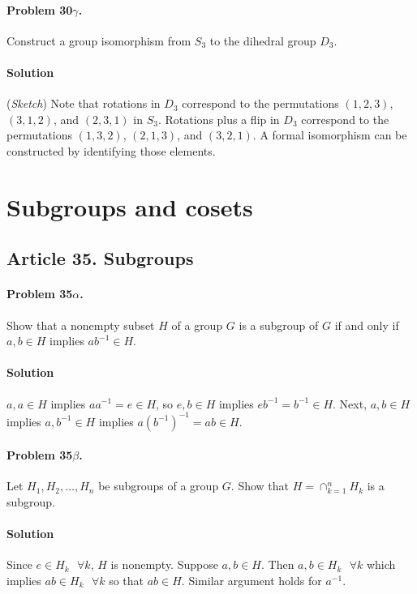 \paragraph{Problem 30$\gamma$.}
Construct a group isomorphism from $S_3$ to the dihedral group $D_3$.

\paragraph*{Solution}
(\textit{Sketch}) Note that rotations in $D_3$ correspond to the permutations
$(1,2,3)$, $(3,1,2)$, and $(2,3,1)$ in $S_3$. Rotations plus a flip in $D_3$
correspond to the permutations $(1,3,2)$, $(2,1,3)$, and $(3,2,1)$. A formal
isomorphism can be constructed by identifying those elements.


\section{Subgroups and cosets}


\subsection{Article 35. Subgroups}

\paragraph{Problem 35$\alpha$.}
Show that a nonempty subset $H$ of a group $G$ is a subgroup of $G$ if and only
if $a, b \in H$ implies $ab^{-1} \in H$.

\paragraph*{Solution}
$a,a \in H$ implies $aa^{-1} = e \in H$, so $e,b \in H$ implies $eb^{-1} = b^{-1}
\in H$. Next, $a, b \in H$ implies $a, b^{-1} \in H$ implies $a(b^{-1})^{-1} =
ab \in H$.

\paragraph{Problem 35$\beta$.}
Let $H_1, H_2, \dots, H_n$ be subgroups of a group $G$. Show that
$H = \cap_{k=1}^n H_k$ is a subgroup.

\paragraph*{Solution}
Since $e \in H_k \mbox{ } \forall k$, $H$ is nonempty.
Suppose $a, b \in H$. Then $a, b \in H_k \mbox{ } \forall k$ which implies
$ab \in H_k \mbox{ } \forall k$ so that $ab \in H$. Similar argument holds for $a^{-1}$.

